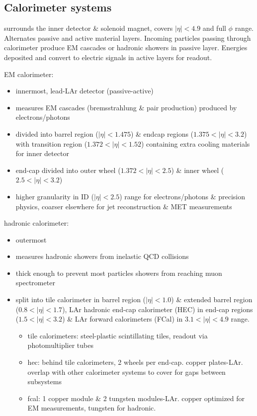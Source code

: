 \documentclass[../thesis.tex]{subfiles}
\begin{document}
\subsection{Calorimeter systems}
surrounds the inner detector \& solenoid magnet, covers $|\eta|<4.9$ and full $\phi$ range. Alternates passive and active material layers. Incoming particles passing through calorimeter produce EM cascades or hadronic showers in passive layer. Energies deposited and convert to electric signals in active layers for readout.\\
\begin{multicols}{2}
EM calorimeter: 
\begin{itemize}
\item innermost, lead-LAr detector (passive-active)
\item measures EM cascades (bremsstrahlung \& pair production) produced by electrons/photons
\item divided into barrel region ($|\eta|<1.475$) \& endcap regions ($1.375<|\eta|<3.2$) with transition region ($1.372<|\eta|<1.52$) containing extra cooling materials for inner detector
\item end-cap divided into outer wheel ($1.372<|\eta|<2.5$) \& inner wheel ($2.5<|\eta|<3.2$)
\item higher granularity in ID ($|\eta|<2.5$) range for electrons/photons \& precision physics, coarser elsewhere for jet reconstruction \& MET measurements
\end{itemize}

hadronic calorimeter: 
\begin{itemize}
\item outermost
\item measures hadronic showers from inelastic QCD collisions
\item thick enough to prevent most particles showers from reaching muon spectrometer
\item split into tile calorimeter in barrel region ($|\eta|<1.0$) \& extended barrel region ($0.8<|\eta|<1.7$), LAr hadronic end-cap calorimeter (HEC) in end-cap regions ($1.5<|\eta|<3.2$)  \& LAr forward calorimeters (FCal) in $3.1<|\eta|<4.9$ range.

\begin{itemize}
\item tile calorimeters: steel-plastic scintillating tiles, readout via photomultiplier tubes
\item hec: behind tile calorimeters, 2 wheels per end-cap. copper plates-LAr. overlap with other calorimeter systems to cover for gaps between subsystems
\item fcal: 1 copper module \& 2 tungsten modules-LAr. copper optimized for EM measurements, tungsten for hadronic.
\end{itemize}
\end{itemize}
\end{multicols}
\end{document}
